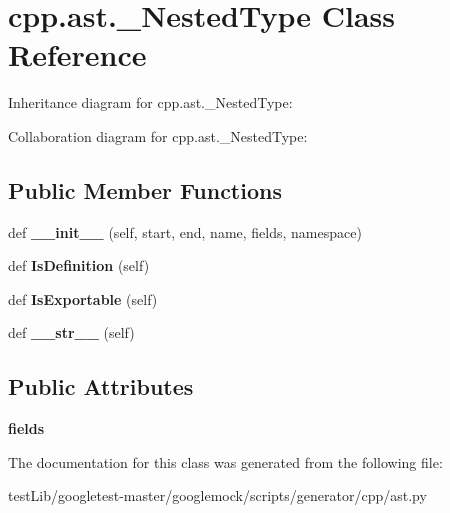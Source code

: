 \hypertarget{classcpp_1_1ast_1_1__NestedType}{}\section{cpp.\+ast.\+\_\+\+Nested\+Type Class Reference}
\label{classcpp_1_1ast_1_1__NestedType}


Inheritance diagram for cpp.\+ast.\+\_\+\+Nested\+Type\+:


Collaboration diagram for cpp.\+ast.\+\_\+\+Nested\+Type\+:
\subsection*{Public Member Functions}
\begin{DoxyCompactItemize}
\item 
\mbox{\label{classcpp_1_1ast_1_1__NestedType_a63acff60f38885be6cc11231fffc3f4e}} 
def {\bfseries \+\_\+\+\_\+init\+\_\+\+\_\+} (self, start, end, name, fields, namespace)
\item 
\mbox{\label{classcpp_1_1ast_1_1__NestedType_a9f160999863f39c9032f60b014e213d5}} 
def {\bfseries Is\+Definition} (self)
\item 
\mbox{\label{classcpp_1_1ast_1_1__NestedType_a689f8b0dc20e6070938825eee483dd2f}} 
def {\bfseries Is\+Exportable} (self)
\item 
\mbox{\label{classcpp_1_1ast_1_1__NestedType_a18901ec6acba88c526d703444bf4d52c}} 
def {\bfseries \+\_\+\+\_\+str\+\_\+\+\_\+} (self)
\end{DoxyCompactItemize}
\subsection*{Public Attributes}
\begin{DoxyCompactItemize}
\item 
\mbox{\label{classcpp_1_1ast_1_1__NestedType_aed69c37a409b4d26e6cfde2de3185d86}} 
{\bfseries fields}
\end{DoxyCompactItemize}


The documentation for this class was generated from the following file\+:\begin{DoxyCompactItemize}
\item 
test\+Lib/googletest-\/master/googlemock/scripts/generator/cpp/ast.\+py\end{DoxyCompactItemize}
